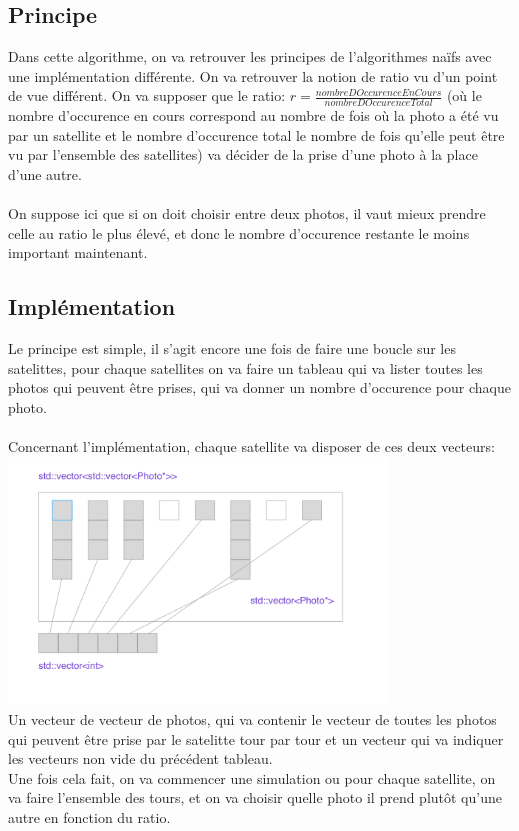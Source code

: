 \documentclass[11pt]{article}
\begin{document}
	\subsection{Principe} %
		\label{sub:principe}
	Dans cette algorithme, on va retrouver les principes de l'algorithmes naïfs avec une implémentation différente. On va retrouver la notion de ratio vu d'un point de vue différent. On va supposer que le ratio: $r=\frac{nombreDOccurenceEnCours}{nombreDOccurenceTotal}$ (où le nombre d'occurence en cours correspond au nombre de fois où la photo a été vu par un satellite et le nombre d'occurence total le nombre de fois qu'elle peut être vu par l'ensemble des satellites) va décider de la prise d'une photo à la place d'une autre.
	\\
	\\
	On suppose ici que si on doit choisir entre deux photos, il vaut mieux prendre celle au ratio le plus élevé, et donc le nombre d'occurence restante le moins important maintenant.


	\subsection{Implémentation} %
		\label{sub:principe}
		Le principe est simple, il s'agit encore une fois de faire une boucle sur les satelittes, pour chaque satellites on va faire un tableau qui va lister toutes les photos qui peuvent être prises, qui va donner un nombre d'occurence pour chaque photo.
		\\
		\\
		Concernant l'implémentation, chaque satellite va disposer de ces deux vecteurs:
		\includegraphics [width=100mm]{images/ex1.png} \\[0.7cm]
		Un vecteur de vecteur de photos, qui va contenir le vecteur de toutes les photos qui peuvent être prise par le satelitte tour par tour et un vecteur qui va indiquer les vecteurs non vide du précédent tableau.
		\\
		Une fois cela fait, on va commencer une simulation ou pour chaque satellite, on va faire l'ensemble des tours, et on va choisir quelle photo il prend plutôt qu'une autre en fonction du ratio.
		
\end{document}
